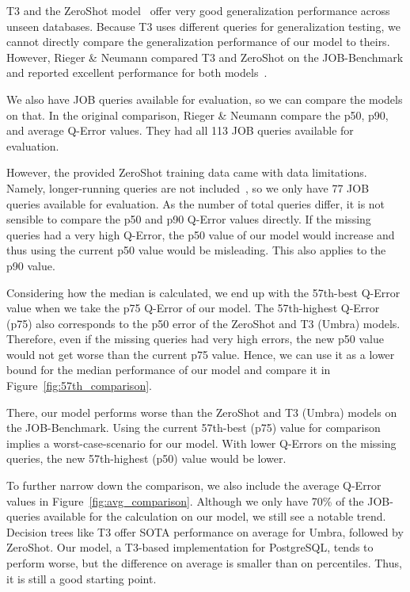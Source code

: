 T3 and the ZeroShot model~\parencite{zeroshot} offer very good generalization performance across unseen databases.
Because T3 uses different queries for generalization testing, we cannot directly compare the generalization performance of our model to theirs.
However, Rieger \& Neumann compared T3 and ZeroShot on the JOB-Benchmark and reported excellent performance for both models~\parencite{t3}.

We also have JOB queries available for evaluation, so we can compare the models on that.
In the original comparison, Rieger \& Neumann compare the p50, p90, and average Q-Error values.
They had all 113 JOB queries available for evaluation. 

However, the provided ZeroShot training data came with data limitations.
Namely, longer-running queries are not included~\parencite{zeroshot}, so we only have 77 JOB queries available for evaluation.
As the number of total queries differ, it is not sensible to compare the p50 and p90 Q-Error values directly.
If the missing queries had a very high Q-Error, the p50 value of our model would increase and thus using the current p50 value would be misleading.
This also applies to the p90 value.

Considering how the median is calculated, we end up with the 57th-best Q-Error value when we take the p75 Q-Error of our model.
The 57th-highest Q-Error (p75) also corresponds to the p50 error of the ZeroShot and T3 (Umbra) models.
Therefore, even if the missing queries had very high errors, the new p50 value would not get worse than the current p75 value.
Hence, we can use it as a lower bound for the median performance of our model and compare it in Figure~\ref{fig:57th_comparison}.

There, our model performs worse than the ZeroShot and T3 (Umbra) models on the JOB-Benchmark.
Using the current 57th-best (p75) value for comparison implies a worst-case-scenario for our model.
With lower Q-Errors on the missing queries, the new 57th-highest (p50) value would be lower.

To further narrow down the comparison, we also include the average Q-Error values in Figure~\ref{fig:avg_comparison}.
Although we only have 70\% of the JOB-queries available for the calculation on our model, we still see a notable trend. 
Decision trees like T3 offer SOTA performance on average for Umbra, followed by ZeroShot.
Our model, a T3-based implementation for PostgreSQL, tends to perform worse, but the difference on average is smaller than on percentiles.
Thus, it is still a good starting point.

